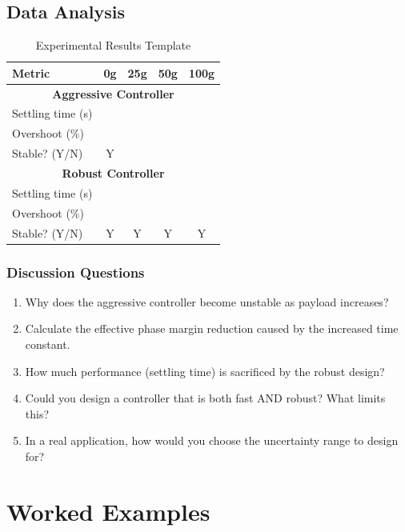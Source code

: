 \subsection{Data Analysis}

\begin{table}[htbp]
\centering
\caption{Experimental Results Template}
\label{tab:robust_results}
\begin{tabular}{lcccc}
\toprule
\textbf{Metric} & \textbf{0g} & \textbf{25g} & \textbf{50g} & \textbf{100g} \\
\midrule
\multicolumn{5}{c}{\textbf{Aggressive Controller}} \\
\midrule
Settling time (s) & & & & \\
Overshoot (\%) & & & & \\
Stable? (Y/N) & Y & & & \\
\midrule
\multicolumn{5}{c}{\textbf{Robust Controller}} \\
\midrule
Settling time (s) & & & & \\
Overshoot (\%) & & & & \\
Stable? (Y/N) & Y & Y & Y & Y \\
\bottomrule
\end{tabular}
\end{table}

\subsubsection{Discussion Questions}

\begin{enumerate}
    \item Why does the aggressive controller become unstable as payload increases?
    \item Calculate the effective phase margin reduction caused by the increased time constant.
    \item How much performance (settling time) is sacrificed by the robust design?
    \item Could you design a controller that is both fast AND robust? What limits this?
    \item In a real application, how would you choose the uncertainty range to design for?
\end{enumerate}

\section{Worked Examples}
\label{sec:examples}

